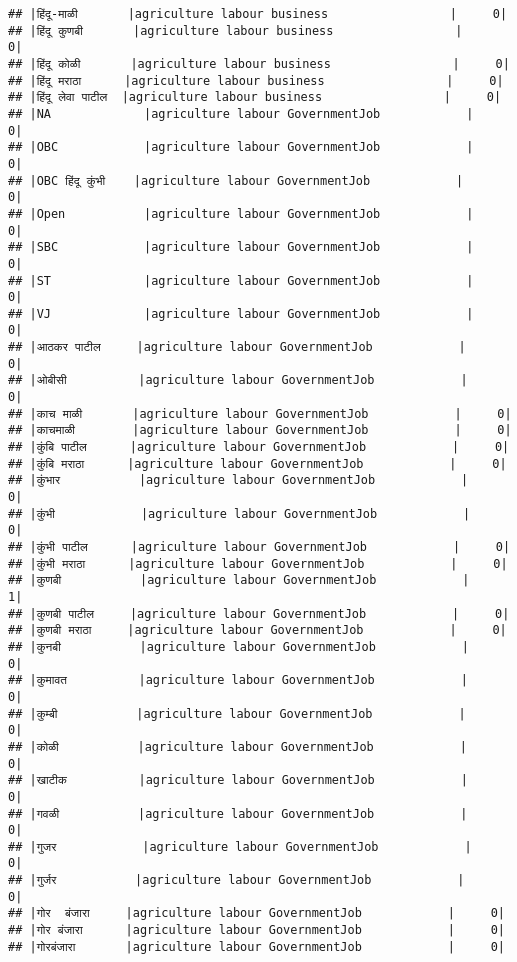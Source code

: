 \documentclass[
]{article}
\begin{document}
\begin{verbatim}
## |हिंदू-माळी       |agriculture labour business                 |     0|
## |हिंदू कुणबी       |agriculture labour business                 |     0|
## |हिंदू कोळी       |agriculture labour business                 |     0|
## |हिंदू मराठा      |agriculture labour business                 |     0|
## |हिंदू लेवा पाटील  |agriculture labour business                 |     0|
## |NA             |agriculture labour GovernmentJob            |     0|
## |OBC            |agriculture labour GovernmentJob            |     0|
## |OBC हिंदू कुंभी    |agriculture labour GovernmentJob            |     0|
## |Open           |agriculture labour GovernmentJob            |     0|
## |SBC            |agriculture labour GovernmentJob            |     0|
## |ST             |agriculture labour GovernmentJob            |     0|
## |VJ             |agriculture labour GovernmentJob            |     0|
## |आठकर पाटील     |agriculture labour GovernmentJob            |     0|
## |ओबीसी          |agriculture labour GovernmentJob            |     0|
## |काच माळी       |agriculture labour GovernmentJob            |     0|
## |काचमाळी        |agriculture labour GovernmentJob            |     0|
## |कुंबि पाटील      |agriculture labour GovernmentJob            |     0|
## |कुंबि मराठा      |agriculture labour GovernmentJob            |     0|
## |कुंभार           |agriculture labour GovernmentJob            |     0|
## |कुंभी            |agriculture labour GovernmentJob            |     0|
## |कुंभी पाटील      |agriculture labour GovernmentJob            |     0|
## |कुंभी मराठा      |agriculture labour GovernmentJob            |     0|
## |कुणबी           |agriculture labour GovernmentJob            |     1|
## |कुणबी पाटील     |agriculture labour GovernmentJob            |     0|
## |कुणबी मराठा     |agriculture labour GovernmentJob            |     0|
## |कुनबी           |agriculture labour GovernmentJob            |     0|
## |कुमावत          |agriculture labour GovernmentJob            |     0|
## |कुम्बी           |agriculture labour GovernmentJob            |     0|
## |कोळी           |agriculture labour GovernmentJob            |     0|
## |खाटीक          |agriculture labour GovernmentJob            |     0|
## |गवळी           |agriculture labour GovernmentJob            |     0|
## |गुजर            |agriculture labour GovernmentJob            |     0|
## |गुर्जर           |agriculture labour GovernmentJob            |     0|
## |गोर  बंजारा     |agriculture labour GovernmentJob            |     0|
## |गोर बंजारा      |agriculture labour GovernmentJob            |     0|
## |गोरबंजारा       |agriculture labour GovernmentJob            |     0|

\end{verbatim}
\end{document}
